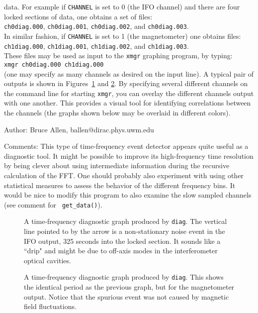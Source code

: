data.  For example if {\tt CHANNEL} is set to 0 (the IFO channel)
and there are four locked sections of data, one obtains a set of
files:\\
{\tt ch0diag.000}, 
{\tt ch0diag.001}, 
{\tt ch0diag.002}, and
{\tt ch0diag.003}.\\
In similar fashion, if {\tt CHANNEL} is set to 1 (the magnetometer)
one obtains files:\\
{\tt ch1diag.000}, 
{\tt ch1diag.001}, 
{\tt ch1diag.002}, and
{\tt ch1diag.003}.\\
These files may be used as input to the {\tt xmgr} graphing program,
by typing:\\
{\tt xmgr ch0diag.000 ch1diag.000}\\
(one may specify as many channels as desired on the input line).  A
typical pair of outputs is shown in Figures~\ref{f:diag0} and
\ref{f:diag1}.  By specifying several different channels on the command
line for starting {\tt xmgr}, you can overlay the different channels
output with one another.  This provides a visual tool for identifying
correlations between the channels (the graphs shown below may be
overlaid in different colors).
\begin{description}
\item{Author:}
Bruce Allen, ballen@dirac.phys.uwm.edu
\item{Comments:}
This type of time-frequency event detector appears quite useful as a
diagnostic tool.  It might be possible to improve its high-frequency
time resolution by being clever about using intermediate information
during the recursive calculation of the FFT.  One should probably also
experiment with using other statistical measures to assess the behavior
of the different frequency bins.  It would be nice to modify this
program to also examine the slow sampled channels (see comment for {\tt
get\_data()}).
\end{description}
\begin{figure}[t]
\begin{center}
\caption{ \label{f:diag0} A time-frequency diagnostic graph produced by
{\tt diag}.  The vertical line pointed to by the arrow is a
non-stationary noise event in the IFO output, 325 seconds into the
locked section.  It sounds like a ``drip" and might be due to off-axis
modes in the interferometer optical cavities.}
\end{center}
\end{figure}
\begin{figure}[b]
\begin{center}
\caption{ \label{f:diag1} A time-frequency diagnostic graph
produced by {\tt diag}.  This shows the identical period as the previous
graph, but for the magnetometer output.  Notice that the spurious event
was not caused by magnetic field fluctuations.}
\end{center}
\end{figure}
\label{s:endof40m}
\clearpage
